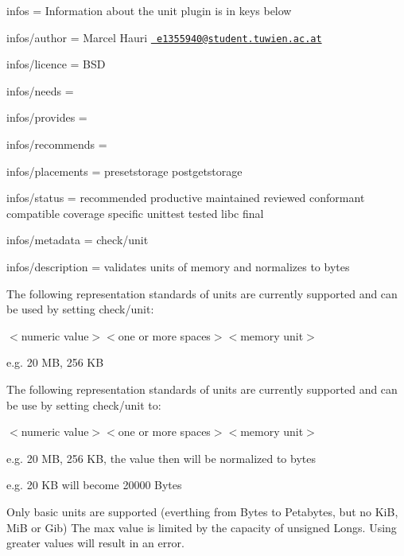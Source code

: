 
\begin{DoxyItemize}
\item infos = Information about the unit plugin is in keys below
\item infos/author = Marcel Hauri \href{mailto:e1355940@student.tuwien.ac.at}{\texttt{ e1355940@student.\+tuwien.\+ac.\+at}}
\item infos/licence = B\+SD
\item infos/needs =
\item infos/provides =
\item infos/recommends =
\item infos/placements = presetstorage postgetstorage
\item infos/status = recommended productive maintained reviewed conformant compatible coverage specific unittest tested libc final
\item infos/metadata = check/unit
\item infos/description = validates units of memory and normalizes to bytes
\end{DoxyItemize}

The following representation standards of units are currently supported and can be used by setting {\ttfamily check/unit}\+:


\begin{DoxyItemize}
\item {\ttfamily $<$numeric value$>$$<$one or more spaces$>$$<$memory unit$>$}

e.\+g. 20 MB, 256 KB
\end{DoxyItemize}

The following representation standards of units are currently supported and can be use by setting {\ttfamily check/unit} to\+:


\begin{DoxyItemize}
\item {\ttfamily $<$numeric value$>$$<$one or more spaces$>$$<$memory unit$>$}

e.\+g. 20 MB, 256 KB, the value then will be normalized to bytes
\end{DoxyItemize}

e.\+g. 20 KB will become 20000 Bytes

Only basic units are supported (everthing from Bytes to Petabytes, but no KiB, MiB or Gib) The max value is limited by the capacity of unsigned Longs. Using greater values will result in an error. 